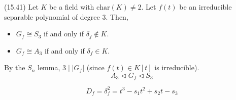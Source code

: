 \vspace{2ex}
\begin{ex}
(15.41) Let $K$ be a field with $\mathrm{char}(K)\ne 2$. Let $f(t)$ be an irreducible separable polynomial of degree $3$. Then,
\begin{itemize}
\item[(i)] $G_{f}\cong S_{3}$ if and only if $\delta _{f}\notin K$.
\item[(ii)] $G_{f}\cong A_3$ if and only if $\delta _{f}\in K$. 
\end{itemize}
\end{ex}
\vspace{2ex}
\begin{rmk}
By the $S_{n}$ lemma, $3\;|\;|G_{f}|$ (since $f(t)\in K[t]$ is irreducible). 
\[A_3\triangleleft G_{f}\triangleleft S_{3}\]
\end{rmk}
\vspace{2ex}
\begin{rmk}
\[D_{f}=\delta _{f}^2=t^3-s_1t^2+s_2t-s_3\]
\end{rmk}
\vspace{2ex}

